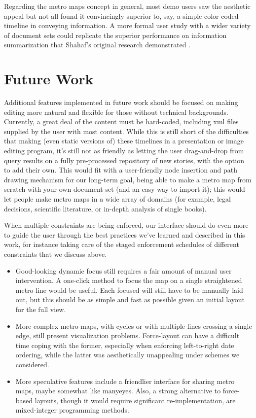 \documentclass{chi2009}
\begin{document}
Regarding the metro maps concept in general, most demo users saw the aesthetic appeal but not all found it convincingly superior to, say, a simple color-coded timeline in conveying information. A more formal user study with a wider variety of document sets could replicate the superior performance on information summarization that Shahaf’s original research demonstrated \cite{}.

\section{Future Work}

Additional features implemented in future work should be focused on making editing more natural and flexible for those without technical backgrounds. Currently, a great deal of the content must be hard-coded, including xml files supplied by the user with most content. While this is still short of the difficulties that making (even static versions of) these timelines in a presentation or image editing program, it's still not as friendly as letting the user drag-and-drop from query results on a fully pre-processed repository of new stories, with the option to add their own. This would fit with a user-friendly node insertion and path drawing mechanism for our long-term goal, being able to make a metro map from scratch with your own document set (and an easy way to import it); this would let people make metro maps in a wide array of domains (for example, legal decisions, scientific literature, or in-depth analysis of single books).

When multiple constraints are being enforced, our interface should do even more to guide the user through the best practices we’ve learned and described in this work, for instance taking care of the staged enforcement schedules of different constraints that we discuss above.

\begin{itemize}
    \item       Good-looking dynamic focus still requires a fair amount of manual user intervention. A one-click method to focus the map on a single straightened metro line would be useful. Each focused will still have to be manually laid out, but this should be as simple and fast as possible given an initial layout for the full view.
    \item       More complex metro maps, with cycles or with multiple lines crossing a single edge, still present visualization problems. Force-layout can have a difficult time coping with the former, especially when enforcing left-to-right date ordering, while the latter was aesthetically unappealing under schemes we considered.
    \item       More speculative features include a friendlier interface for sharing metro maps, maybe somewhat like manyeyes. Also, a strong alternative to force-based layouts, though it would require significant re-implementation, are mixed-integer programming methods.  
\end{itemize}
\end{document}
